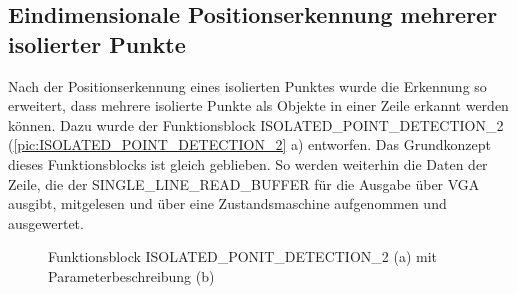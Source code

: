 \documentclass[ngerman,12pt]{article} %
\begin{document}
{\subsection{Eindimensionale Positionserkennung mehrerer isolierter Punkte}
\label{sec:Eindimensionale Positionserkennung mehrerer isolierter Punkte}
Nach der Positionserkennung eines isolierten Punktes wurde die Erkennung so erweitert, dass mehrere isolierte Punkte als Objekte in einer Zeile erkannt werden können. Dazu wurde der Funktionsblock ISOLATED\_POINT\_DETECTION\_2 (\autoref{pic:ISOLATED_POINT_DETECTION_2} a) entworfen. Das Grundkonzept dieses Funktionsblocks ist gleich geblieben. So werden weiterhin die Daten der Zeile, die der SINGLE\_LINE\_READ\_BUFFER für die Ausgabe über VGA ausgibt, mitgelesen und über eine Zustandsmaschine aufgenommen und ausgewertet. \\

\begin{figure}[h!tb]
  \centering
  \qquad
  \caption[Funktionsblock ISOLATED\_PONIT\_DETECTION\_2 mit Parameterbeschreibung]{\label{pic:ISOLATED_POINT_DETECTION_2}Funktionsblock ISOLATED\_PONIT\_DETECTION\_2 (a) mit Parameterbeschreibung (b)}
\end{figure}

}
\end{document}

